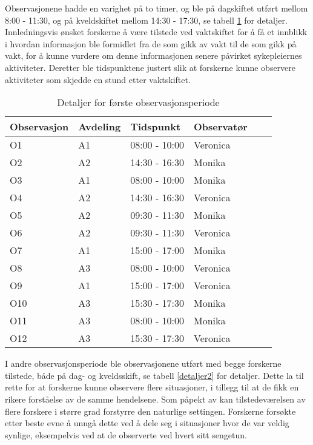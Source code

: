 \noindent
Observasjonene hadde en varighet på to timer, og ble på dagskiftet utført mellom 8:00 - 11:30, og på kveldskiftet mellom 14:30 - 17:30, se tabell \ref{detaljer1} for detaljer.
Innledningsvis ønsket forskerne å være tilstede ved vaktskiftet for å få et innblikk i hvordan informasjon ble formidlet fra de som gikk av vakt til de som gikk på vakt, for å kunne vurdere om denne informasjonen senere påvirket sykepleiernes aktiviteter. Deretter ble tidspunktene justert slik at forskerne kunne observere aktiviteter som skjedde en stund etter vaktskiftet.
 
\begin{table}[H]\centering
    \begin{tabular}{ |l|l|l|l|l|l| }
    \hline
    Observasjon & Avdeling & Tidspunkt & Observatør \\ \hline
       O1 & A1 & 08:00 - 10:00 & Veronica \\ \hline
       O2 & A2 & 14:30 - 16:30 & Monika \\ \hline
      O3 & A1 & 08:00 - 10:00 & Monika \\ \hline
       O4 & A2 & 14:30 - 16:30 & Veronica \\ \hline
         O5 & A2 & 09:30 - 11:30 & Monika \\ \hline
       O6 & A2 & 09:30 - 11:30 & Veronica \\ \hline
      O7 & A1 & 15:00 - 17:00 & Monika \\ \hline
       O8 & A3 & 08:00 - 10:00 & Veronica \\ \hline
       O9 & A1 & 15:00 - 17:00 & Veronica \\ \hline
       O10 & A3 & 15:30 - 17:30 & Monika \\ \hline
      O11 & A3 & 08:00 - 10:00 & Monika \\ \hline
       O12 & A3 & 15:30 - 17:30 & Veronica \\ \hline
    \end{tabular}
    \caption {Detaljer for første observasjonsperiode}
    \label{detaljer1}
\end{table}
 
\noindent
I andre observasjonsperiode ble observasjonene utført med begge forskerne tilstede, både på dag- og kveldsskift, se tabell \ref{detaljer2} for detaljer. Dette la til rette for at forskerne kunne observere flere situasjoner, i tillegg til at de fikk en rikere forståelse av de samme hendelsene.  Som påpekt av \citet{Millen00} kan tilstedeværelsen av flere forskere i større grad forstyrre den naturlige settingen. Forskerne forsøkte etter beste evne å unngå dette ved å dele seg i situasjoner hvor de var veldig synlige, eksempelvis ved at de observerte ved hvert sitt sengetun.
 
